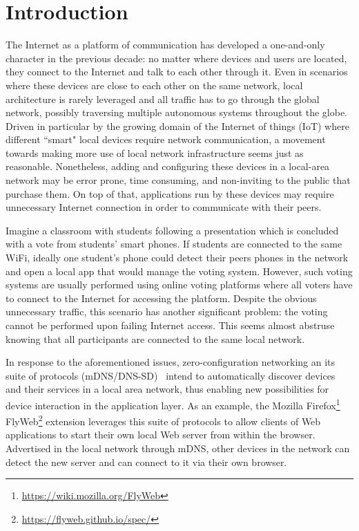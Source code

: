 \section{Introduction}
\label{sec:introduction}

 
The Internet as a platform of communication has developed a one-and-only character in the previous decade: no matter where devices and users are located, they connect to the Internet and talk to each other through it. Even in scenarios where these devices are close to each other on the same network, local architecture is rarely leveraged and all traffic has to go through the global network, possibly traversing multiple autonomous systems throughout the globe. Driven in particular by the growing domain of the Internet of things (IoT) where different ``smart" local devices require network communication, a movement towards making more use of local network infrastructure seems just as reasonable. Nonetheless, adding and configuring these devices in a local-area network may be error prone, time consuming, and non-inviting to the public that purchase them. On top of that, applications run by these devices may require unnecessary Internet connection in order to communicate with their peers. 


Imagine a classroom with students following a presentation which is concluded with a vote from students’ smart phones. If students are connected to the same WiFi, ideally one student's phone could detect their peers phones in the network and open a local app that would manage the voting system. However, such voting systems are usually performed using online voting platforms where all voters have to connect to the Internet for accessing the platform. Despite the obvious unnecessary traffic, this scenario has another significant problem: the voting cannot be performed upon failing Internet access. This seems almost abstruse knowing that all participants are connected to the same local network.


In response to the aforementioned issues, zero-configuration networking an its suite of protocols (mDNS/DNS-SD)~\cite{rfc6762,rfc6763} intend to automatically discover devices and their services in a local area network, thus enabling new possibilities for device interaction in the application layer. As an example, the Mozilla Firefox\footnote{\url{https://wiki.mozilla.org/FlyWeb}} FlyWeb\footnote{\url{https://flyweb.github.io/spec/}} extension leverages this suite of protocols to allow clients of Web applications to start their own local Web server from within the browser. Advertised in the local network through mDNS, other devices in the network can detect the new server and can connect to it via their own browser. 


